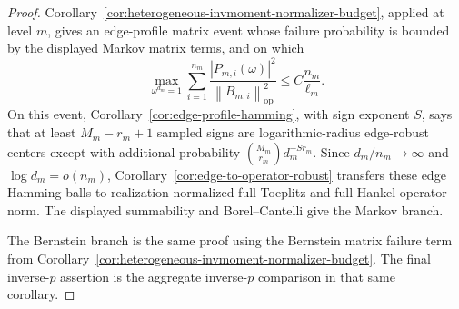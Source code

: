 \documentclass[11pt]{amsart}
\numberwithin{equation}{section}
\theoremstyle{definition}
\theoremstyle{remark}
\newcommand{\op}{\mathrm{op}}
\newcommand{\norm}[1]{\left\lVert #1\right\rVert}
\newcommand{\abs}[1]{\left\lvert #1\right\rvert}
\begin{document}
\begin{proof}
Corollary~\ref{cor:heterogeneous-invmoment-normalizer-budget}, applied at level
\(m\), gives an edge-profile matrix event whose failure probability is bounded
by the displayed Markov matrix terms, and on which
\[
  \max_{\omega^{d_m}=1}
  \sum_{i=1}^{n_m}
  \frac{\abs{P_{m,i}(\omega)}^2}{\norm{B_{m,i}}_{\op}^2}
  \le C\frac{n_m}{\ell_m}.
\]
On this event, Corollary~\ref{cor:edge-profile-hamming}, with sign exponent
\(S\), says that at least \(M_m-r_m+1\) sampled signs are logarithmic-radius
edge-robust centers except with additional probability
\(\binom{M_m}{r_m}d_m^{-S r_m}\).  Since \(d_m/n_m\to\infty\) and
\(\log d_m=o(n_m)\), Corollary~\ref{cor:edge-to-operator-robust} transfers
these edge Hamming balls to realization-normalized full Toeplitz and full
Hankel operator norm.  The displayed summability and Borel--Cantelli give the
Markov branch.

The Bernstein branch is the same proof using the Bernstein matrix failure term
from Corollary~\ref{cor:heterogeneous-invmoment-normalizer-budget}.  The final
inverse-\(p\) assertion is the aggregate inverse-\(p\) comparison in that same
corollary.
\end{proof}
\end{document}
